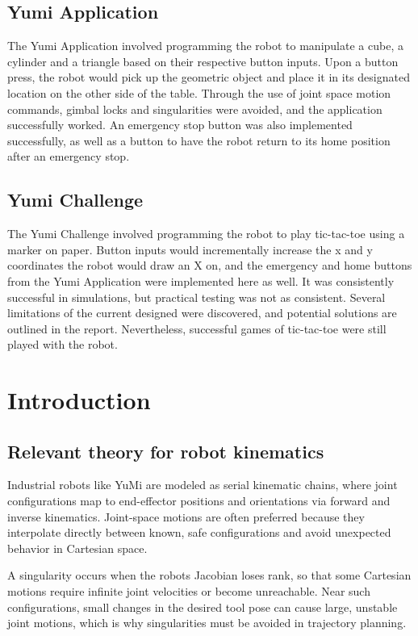 \documentclass[a4paper,12pt]{article}
\begin{document}
\subsection{Yumi Application}
The Yumi Application involved programming the robot to manipulate a cube, a cylinder and a triangle based
on their respective button inputs. Upon a button press, the robot would pick up the geometric object and place
it in its designated location on the other side of the table. Through the use of joint space motion commands,
gimbal locks and singularities were avoided, and the application successfully worked. An emergency stop button
was also implemented successfully, as well as a button to have the robot return to its home position after
an emergency stop.

\subsection{Yumi Challenge}
The Yumi Challenge involved programming the robot to play tic-tac-toe using a marker on paper. Button inputs
would incrementally increase the x and y coordinates the robot would draw an X on, and the emergency and home
buttons from the Yumi Application were implemented here as well. It was consistently successful in simulations,
but practical testing was not as consistent. Several limitations of the current designed were discovered, and
potential solutions are outlined in the report. Nevertheless, successful games of tic-tac-toe were still played
with the robot.

\section{Introduction}

\subsection{Relevant theory for robot kinematics}
Industrial robots like YuMi are modeled as serial kinematic chains, where joint configurations map to end-effector positions and orientations via forward and inverse kinematics. Joint-space motions are often preferred because they interpolate directly between known, safe configurations and avoid unexpected behavior in Cartesian space.

A singularity occurs when the robots Jacobian loses rank, so that some Cartesian motions require infinite joint velocities or become unreachable. Near such configurations, small changes in the desired tool pose can cause large, unstable joint motions, which is why singularities must be avoided in trajectory planning.
\end{document}
